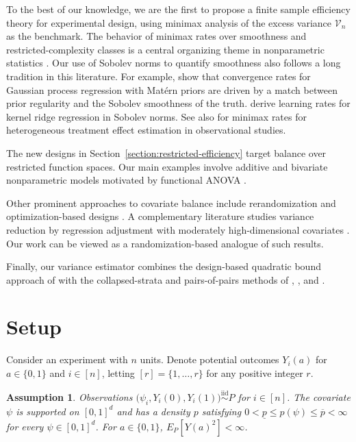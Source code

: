 \documentclass[letterpaper,12pt]{article}
\newtheorem{assumption}[thm]{Assumption}
\theoremstyle{definition}
\numberwithin{equation}{section}
\newcommand{\mc}{\mathcal}
\newcommand{\simiid}{\stackrel{\mathrm{iid}}{\sim}}
\begin{document}
To the best of our knowledge, we are the first to propose a finite sample efficiency theory for experimental design, using minimax analysis of the excess variance $\mc V_n$ as the benchmark.
The behavior of minimax rates over smoothness and restricted-complexity classes is a central organizing theme in nonparametric statistics \citep{stone1982optimal,yang1999information,gine2016mathematical}.
Our use of Sobolev norms to quantify smoothness also follows a long tradition in this literature.
For example, \citet{vdv2011information} show that convergence rates for Gaussian process regression with Mat\'ern priors are driven by a match between prior regularity and the Sobolev smoothness of the truth. 
\citet{fischer2020sobolev} derive learning rates for kernel ridge regression in Sobolev norms.
See also \citet{kennedy2024minimax} for minimax rates for heterogeneous treatment effect estimation in observational studies.

The new designs in Section~\ref{section:restricted-efficiency} target balance over restricted function spaces. 
Our main examples involve additive and bivariate nonparametric models motivated by functional ANOVA \citep{stone1985additive,hastie1986gam,sobol1993}.

Other prominent approaches to covariate balance include rerandomization \citep{morgan2012,li2018asymptotic} and optimization-based designs \citep{kasy2016,krieger2019}.
A complementary literature studies variance reduction by regression adjustment with moderately high-dimensional covariates \citep{bloniarz2016lasso,wager2016highdimensional,lei2021regression,lu2025debiased}.
Our work can be viewed as a randomization-based analogue of such results.

Finally, our variance estimator combines the design-based quadratic bound approach of \citet{harshaw2026optimized} with the collapsed-strata and pairs-of-pairs methods of \citet{hansen1953}, \citet{abadie2008}, and \cite{bai2021inference}.


\section{Setup}\label{section:setup}

Consider an experiment with $n$ units.
Denote potential outcomes $Y_i(a)$ for $a\in\{0,1\}$ and $i\in[n]$, letting $[r]=\{1,\ldots,r\}$ for any positive integer $r$.

\begin{assumption}\label{assumption:sampling}
Observations $\bigl(\psi_i,Y_i(0),Y_i(1)\bigr)\simiid P$ for $i\in[n]$.
The covariate $\psi$ is supported on $[0,1]^d$ and has a density $p$ satisfying $0<\underline p\leq p(\psi)\leq\overline p<\infty$ for every $\psi\in[0,1]^d$.
For $a\in\{0,1\}$, $E_P[Y(a)^2]<\infty$.
\end{assumption}
\end{document}
